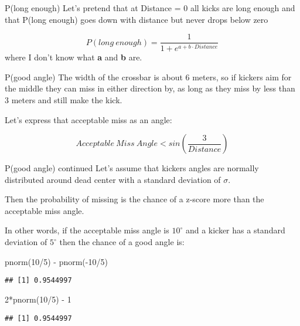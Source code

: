 \documentclass[
  ignorenonframetext,
]{beamer}
\newenvironment{Shaded}{\begin{snugshade}}{\end{snugshade}}
\newcommand{\DecValTok}[1]{\textcolor[rgb]{0.00,0.00,0.81}{#1}}
\newcommand{\FunctionTok}[1]{\textcolor[rgb]{0.00,0.00,0.00}{#1}}
\newcommand{\NormalTok}[1]{#1}
\newcommand{\SpecialCharTok}[1]{\textcolor[rgb]{0.00,0.00,0.00}{#1}}
\begin{document}
\begin{frame}{P(long enough)}
\protect\hypertarget{plong-enough}{}
Let's pretend that at Distance = 0 all kicks are long enough and that
P(long enough) goes down with distance but never drops below zero

\[P(long\ enough) = \frac{1}{1 + e^{a + b\cdot Distance}}\] where I
don't know what \textbf{a} and \textbf{b} are.
\end{frame}

\begin{frame}{P(good angle)}
\protect\hypertarget{pgood-angle}{}
The width of the crossbar is about 6 meters, so if kickers aim for the
middle they can miss in either direction by, as long as they miss by
less than 3 meters and still make the kick.

Let's express that acceptable miss as an angle:

\[Acceptable\ Miss\ Angle < sin(\frac{3}{Distance})\]
\end{frame}

\begin{frame}[fragile]{P(good angle) continued}
\protect\hypertarget{pgood-angle-continued}{}
Let's assume that kickers angles are normally distributed around dead
center with a standard deviation of \(\sigma\).

Then the probability of missing is the chance of a z-score more than the
acceptable miss angle.

In other words, if the acceptable miss angle is \(10^{\circ}\) and a
kicker has a standard deviation of \(5^{\circ}\) then the chance of a
good angle is:

\begin{Shaded}
\begin{Highlighting}[]
\FunctionTok{pnorm}\NormalTok{(}\DecValTok{10}\SpecialCharTok{/}\DecValTok{5}\NormalTok{) }\SpecialCharTok{{-}} \FunctionTok{pnorm}\NormalTok{(}\SpecialCharTok{{-}}\DecValTok{10}\SpecialCharTok{/}\DecValTok{5}\NormalTok{)}
\end{Highlighting}
\end{Shaded}

\begin{verbatim}
## [1] 0.9544997
\end{verbatim}

\begin{Shaded}
\begin{Highlighting}[]
\DecValTok{2}\SpecialCharTok{*}\FunctionTok{pnorm}\NormalTok{(}\DecValTok{10}\SpecialCharTok{/}\DecValTok{5}\NormalTok{) }\SpecialCharTok{{-}} \DecValTok{1}
\end{Highlighting}
\end{Shaded}

\begin{verbatim}
## [1] 0.9544997
\end{verbatim}
\end{frame}
\end{document}
